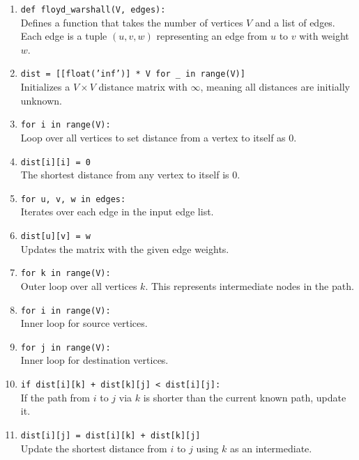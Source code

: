 \documentclass[14pt,a4paper]{extarticle}
\begin{document}
\begin{enumerate}[leftmargin=2em]
    \item \texttt{def floyd\_warshall(V, edges):} \\
    Defines a function that takes the number of vertices \(V\) and a list of edges. Each edge is a tuple \((u, v, w)\) representing an edge from \(u\) to \(v\) with weight \(w\).

    \item \texttt{dist = [[float('inf')] * V for \_ in range(V)]} \\
    Initializes a \(V \times V\) distance matrix with \(\infty\), meaning all distances are initially unknown.

    \item \texttt{for i in range(V):} \\
    Loop over all vertices to set distance from a vertex to itself as 0.

    \item \texttt{dist[i][i] = 0} \\
    The shortest distance from any vertex to itself is 0.

    \item \texttt{for u, v, w in edges:} \\
    Iterates over each edge in the input edge list.

    \item \texttt{dist[u][v] = w} \\
    Updates the matrix with the given edge weights.

    \item \texttt{for k in range(V):} \\
    Outer loop over all vertices \(k\). This represents intermediate nodes in the path.

    \item \texttt{for i in range(V):} \\
    Inner loop for source vertices.

    \item \texttt{for j in range(V):} \\
    Inner loop for destination vertices.

    \item \texttt{if dist[i][k] + dist[k][j] < dist[i][j]:} \\
    If the path from \(i\) to \(j\) via \(k\) is shorter than the current known path, update it.

    \item \texttt{dist[i][j] = dist[i][k] + dist[k][j]} \\
    Update the shortest distance from \(i\) to \(j\) using \(k\) as an intermediate.


\end{enumerate}
\end{document}
